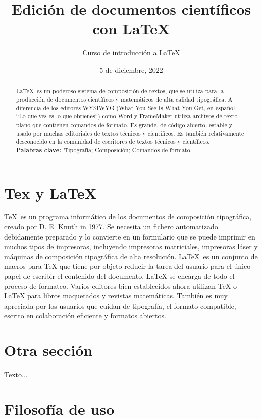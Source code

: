 \documentclass[letterpaper,11pt]{achemso} %
\title{Edición de documentos científicos con \LaTeX}
\author{Curso de introducción a \LaTeX}
\date{5 de diciembre, 2022}
\begin{document}
	\maketitle %
	\tableofcontents
	
	\begin{abstract}
		\LaTeX\ es un poderoso sistema de composición de textos, que se utiliza
		para la producción de documentos científicos y matemáticos
		de alta calidad tipográfica. A diferencia de los editores WYSIWYG (What You See Is What You Get, en español ``Lo que ves es lo que obtienes'') como Word y FrameMaker 
		utiliza archivos de texto plano que contienen 
		comandos de formato. Es grande, de código abierto, estable y usado
		por muchas editoriales de textos técnicos y científicos. Es
		también relativamente desconocido en la comunidad de escritores de textos técnicos y científicos.\\
		
		\textbf{Palabras clave:}\ Tipografía; Composición; Comandos de formato.
	\end{abstract}
	
	\section{Tex y LaTeX} %
	
	\TeX\ es un programa informático de los documentos de composición tipográfica, creado por D. E. Knuth in 1977. Se necesita un fichero automatizado debidamente preparado y lo convierte en un formulario que se puede imprimir en muchos tipos de impresoras, incluyendo impresoras matriciales, impresoras láser y máquinas de composición tipográfica de alta resolución. \LaTeX\ es un conjunto de macros para TeX que tiene por objeto reducir la tarea del usuario para el único papel de escribir el contenido del documento, LaTeX se encarga de todo el proceso de formateo. Varios editores bien establecidos ahora utilizan TeX o LaTeX para libros maquetados y revistas matemáticas. También es muy apreciada por los usuarios que cuidan de tipografía, el formato compatible, escrito en colaboración eficiente y formatos abiertos.
	
	\section{ Otra sección}
	
	Texto...
	
	\section{Filosofía de uso} %
	
\end{document}
